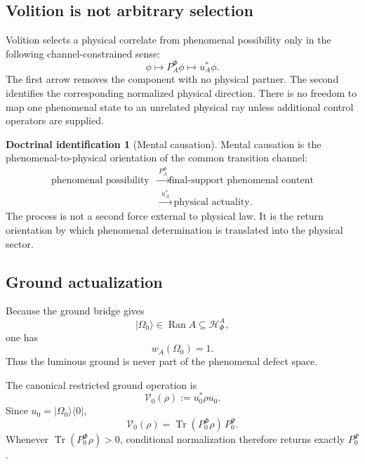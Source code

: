 \documentclass[11pt,reqno]{scrartcl}
\newcommand{\PzeroP}{P_{0}^{\Psi}}
\newcommand{\PzeroF}{P_{0}^{\Phi}}
\newcommand{\polA}{u_A}
\newcommand{\uzero}{u_{0}}
\newcommand{\ket}[1]{\lvert #1\rangle}
\newcommand{\bra}[1]{\langle #1\rvert}
\DeclareMathOperator{\Ran}{Ran}
\newcommand{\actHF}{\mathscr H_{\Phi}^{A}}
\newcommand{\suppProjF}{P_{A}^{\Phi}}
\DeclareMathOperator{\Tr}{Tr}
\newcommand{\presentWeight}{w_{A}}
\newcommand{\returnGroundOp}{\mathcal V_{0}}
\theoremstyle{plain}
\theoremstyle{definition}
\newtheorem{identification}[identification]{Doctrinal identification}
\theoremstyle{remark}
\begin{document}
\subsection{Volition is not arbitrary selection}

Volition selects a physical correlate from phenomenal possibility only in the
following channel-constrained sense:
\begin{equation}
  \phi
  \longmapsto
  \suppProjF\phi
  \longmapsto
  \polA^*\phi.
  \label{eq:constrained-selection}
\end{equation}
The first arrow removes the component with no physical partner.  The second
identifies the corresponding normalized physical direction.  There is no
freedom to map one phenomenal state to an unrelated physical ray unless
additional control operators are supplied.

\begin{identification}[Mental causation]
\label{id:mental-causation}
Mental causation is the phenomenal-to-physical orientation of the common
transition channel:
\begin{equation}
  \boxed{
  \begin{aligned}
  \text{phenomenal possibility}
  &\xrightarrow{\ \suppProjF\ }
  \text{final-support phenomenal content}\\[-1mm]
  &\xrightarrow{\ \polA^*\ }
  \text{physical actuality}.
  \end{aligned}}
  \label{eq:mental-causation-slogan}
\end{equation}
The process is not a second force external to physical law.  It is the return
orientation by which phenomenal determination is translated into the
physical sector.
\end{identification}

\subsection{Ground actualization}

Because the ground bridge gives
\begin{equation}
  \ket{\Omega_0}\in\Ran A\subseteq\actHF,
\end{equation}
one has
\begin{equation}
  \presentWeight(\Omega_0)=1.
  \label{eq:ground-fully-actualizable}
\end{equation}
Thus the luminous ground is never part of the phenomenal defect space.

The canonical restricted ground operation is
\begin{equation}
  \boxed{
  \returnGroundOp(\rho):=\uzero^*\rho\uzero.}
  \label{eq:restricted-ground-return-operation}
\end{equation}
Since $\uzero=\ket{\Omega_0}\!\bra0$,
\begin{equation}
  \returnGroundOp(\rho)
  =\Tr(\PzeroF\rho)\,\PzeroP.
  \label{eq:restricted-ground-return-formula}
\end{equation}
Whenever $\Tr(\PzeroF\rho)>0$, conditional normalization therefore returns
exactly $\PzeroP$.
\end{document}
